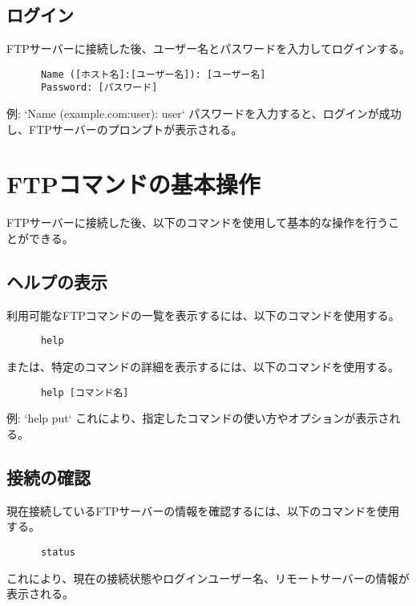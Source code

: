 \documentclass[a4paper,10pt]{jsarticle}
\begin{document}
    \subsection{ログイン}
    FTPサーバーに接続した後、ユーザー名とパスワードを入力してログインする。
    \begin{lstlisting}
      Name ([ホスト名]:[ユーザー名]): [ユーザー名]
      Password: [パスワード]
    \end{lstlisting}
    例: `Name (example.com:user): user`
    パスワードを入力すると、ログインが成功し、FTPサーバーのプロンプトが表示される。
\section{FTPコマンドの基本操作}
    FTPサーバーに接続した後、以下のコマンドを使用して基本的な操作を行うことができる。

    \subsection{ヘルプの表示}
    利用可能なFTPコマンドの一覧を表示するには、以下のコマンドを使用する。
    \begin{lstlisting}
      help
    \end{lstlisting}
    または、特定のコマンドの詳細を表示するには、以下のコマンドを使用する。
    \begin{lstlisting}
      help [コマンド名]
    \end{lstlisting}
    例: `help put`
    これにより、指定したコマンドの使い方やオプションが表示される。

    \subsection{接続の確認}
    現在接続しているFTPサーバーの情報を確認するには、以下のコマンドを使用する。
    \begin{lstlisting}
      status
    \end{lstlisting}
    これにより、現在の接続状態やログインユーザー名、リモートサーバーの情報が表示される。
\end{document}
